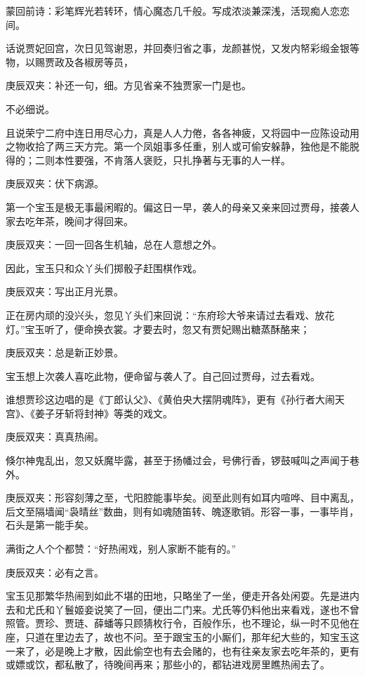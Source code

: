 \begin{parag}
    \begin{note}蒙回前诗：彩笔辉光若转环，情心魔态几千般。写成浓淡兼深浅，活现痴人恋恋间。\end{note}
\end{parag}


\begin{parag}
    话说贾妃回宫，次日见驾谢恩，并回奏归省之事，龙颜甚悦，又发内帑彩缎金银等物，以赐贾政及各椒房等员，\begin{note}庚辰双夹：补还一句，细。方见省亲不独贾家一门是也。\end{note}不必细说。
\end{parag}


\begin{parag}
    且说荣宁二府中连日用尽心力，真是人人力倦，各各神疲，又将园中一应陈设动用之物收拾了两三天方完。第一个凤姐事多任重，别人或可偷安躲静，独他是不能脱得的；二则本性要强，不肯落人褒贬，只扎挣著与无事的人一样。\begin{note}庚辰双夹：伏下病源。\end{note}第一个宝玉是极无事最闲暇的。偏这日一早，袭人的母亲又亲来回过贾母，接袭人家去吃年茶，晚间才得回来。\begin{note}庚辰双夹：一回一回各生机轴，总在人意想之外。\end{note}因此，宝玉只和众丫头们掷骰子赶围棋作戏。\begin{note}庚辰双夹：写出正月光景。\end{note}正在房内顽的没兴头，忽见丫头们来回说：“东府珍大爷来请过去看戏、放花灯。”宝玉听了，便命换衣裳。才要去时，忽又有贾妃赐出糖蒸酥酪来；\begin{note}庚辰双夹：总是新正妙景。\end{note}宝玉想上次袭人喜吃此物，便命留与袭人了。自己回过贾母，过去看戏。
\end{parag}


\begin{parag}
    谁想贾珍这边唱的是《丁郎认父》、《黄伯央大摆阴魂阵》，更有《孙行者大闹天宫》、《姜子牙斩将封神》等类的戏文。\begin{note}庚辰双夹：真真热闹。\end{note}倏尔神鬼乱出，忽又妖魔毕露，甚至于扬幡过会，号佛行香，锣鼓喊叫之声闻于巷外。\begin{note}庚辰双夹：形容刻薄之至，弋阳腔能事毕矣。阅至此则有如耳内喧哗、目中离乱，后文至隔墙闻“袅晴丝”数曲，则有如魂随笛转、魄逐歌销。形容一事，一事毕肖，石头是第一能手矣。\end{note}满街之人个个都赞：“好热闹戏，别人家断不能有的。”\begin{note}庚辰双夹：必有之言。\end{note}宝玉见那繁华热闹到如此不堪的田地，只略坐了一坐，便走开各处闲耍。先是进内去和尤氏和丫鬟姬妾说笑了一回，便出二门来。尤氏等仍料他出来看戏，遂也不曾照管。贾珍、贾琏、薛蟠等只顾猜枚行令，百般作乐，也不理论，纵一时不见他在座，只道在里边去了，故也不问。至于跟宝玉的小厮们，那年纪大些的，知宝玉这一来了，必是晚上才散，因此偷空也有去会赌的，也有往亲友家去吃年茶的，更有或嫖或饮，都私散了，待晚间再来；那些小的，都钻进戏房里瞧热闹去了。
\end{parag}


